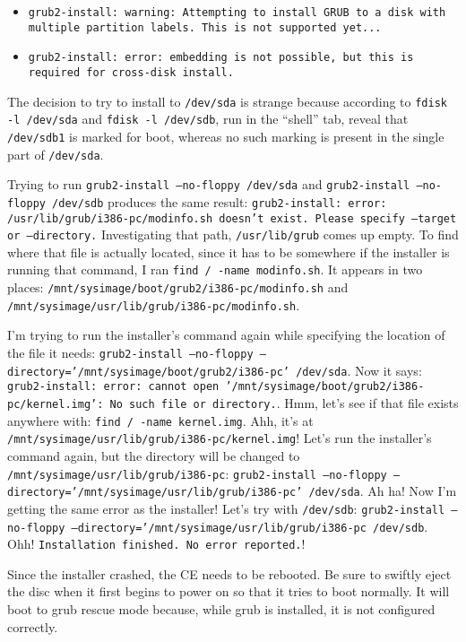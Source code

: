 \documentclass[12pt]{article}
\begin{document}
\begin{itemize}
\item {\tt grub2-install: warning: Attempting to install GRUB to a disk with multiple
    partition labels. This is not supported yet...}
\item {\tt grub2-install: error: embedding is not possible, but this is required
    for cross-disk install.}
\end{itemize}

The decision to try to install to {\tt /dev/sda} is strange because according to
{\tt fdisk -l /dev/sda} and {\tt fdisk -l /dev/sdb}, run in the ``shell'' tab,
reveal that {\tt /dev/sdb1} is marked for boot, whereas no such marking is
present in the single part of {\tt /dev/sda}.

\qq Trying to run {\tt grub2-install --no-floppy /dev/sda} and {\tt grub2-install
  --no-floppy /dev/sdb} produces the same result: {\tt grub2-install: error:
  /usr/lib/grub/i386-pc/modinfo.sh doesn't exist. Please specify --target or
  --directory.} Investigating that path, {\tt /usr/lib/grub} comes up empty. To
find where that file is actually located, since it has to be somewhere if the
installer is running that command, I ran {\tt find / -name modinfo.sh}. It
appears in two places: {\tt /mnt/sysimage/boot/grub2/i386-pc/modinfo.sh} and
{\tt /mnt/sysimage/usr/lib/grub/i386-pc/modinfo.sh}.

\qq I'm trying to run the installer's command again while specifying the
location of the file it needs: {\tt grub2-install --no-floppy
  --directory='/mnt/sysimage/boot/grub2/i386-pc' /dev/sda}. Now it says:
{\tt grub2-install: error: cannot open
  '/mnt/sysimage/boot/grub2/i386-pc/kernel.img': No such file or
  directory.}. Hmm, let's see if that file exists anywhere with: {\tt find /
  -name kernel.img}. Ahh, it's at
{\tt /mnt/sysimage/usr/lib/grub/i386-pc/kernel.img}! Let's run the installer's
command again, but the directory will be changed to
{\tt /mnt/sysimage/usr/lib/grub/i386-pc}:
{\tt grub2-install --no-floppy --directory='/mnt/sysimage/usr/lib/grub/i386-pc'
  /dev/sda}. Ah ha! Now I'm getting the same error as the installer! Let's try
with {\tt /dev/sdb}: {\tt grub2-install --no-floppy
  --directory='/mnt/sysimage/usr/lib/grub/i386-pc /dev/sdb}. Ohh!
{\tt Installation finished. No error reported.}! 

\qq Since the installer crashed, the CE needs to be rebooted. Be sure to swiftly
eject the disc when it first begins to power on so that it tries to boot
normally. It will boot to grub rescue mode because, while grub is installed, it
is not configured correctly.
\end{document}
